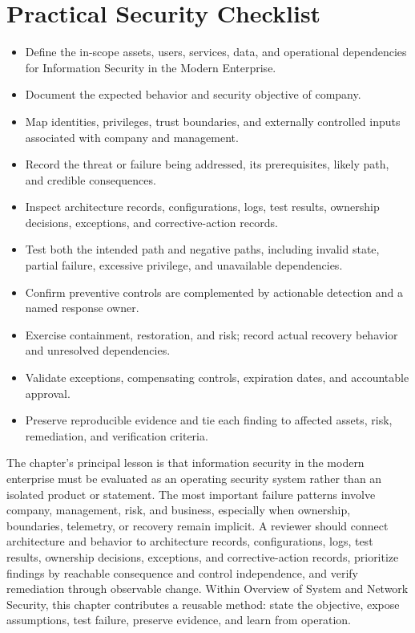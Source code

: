 \documentclass[11pt]{article}
\begin{document}
\section*{Practical Security Checklist}
\begin{itemize}[label=$\square$]
\item Define the in-scope assets, users, services, data, and operational dependencies for Information Security in the Modern Enterprise.
\item Document the expected behavior and security objective of company.
\item Map identities, privileges, trust boundaries, and externally controlled inputs associated with company and management.
\item Record the threat or failure being addressed, its prerequisites, likely path, and credible consequences.
\item Inspect architecture records, configurations, logs, test results, ownership decisions, exceptions, and corrective-action records.
\item Test both the intended path and negative paths, including invalid state, partial failure, excessive privilege, and unavailable dependencies.
\item Confirm preventive controls are complemented by actionable detection and a named response owner.
\item Exercise containment, restoration, and risk; record actual recovery behavior and unresolved dependencies.
\item Validate exceptions, compensating controls, expiration dates, and accountable approval.
\item Preserve reproducible evidence and tie each finding to affected assets, risk, remediation, and verification criteria.
\end{itemize}
\begin{synthesisbox}
The chapter's principal lesson is that information security in the modern enterprise must be evaluated as an operating security system rather than an isolated product or statement. The most important failure patterns involve company, management, risk, and business, especially when ownership, boundaries, telemetry, or recovery remain implicit. A reviewer should connect architecture and behavior to architecture records, configurations, logs, test results, ownership decisions, exceptions, and corrective-action records, prioritize findings by reachable consequence and control independence, and verify remediation through observable change. Within Overview of System and Network Security, this chapter contributes a reusable method: state the objective, expose assumptions, test failure, preserve evidence, and learn from operation.
\end{synthesisbox}
\end{document}
